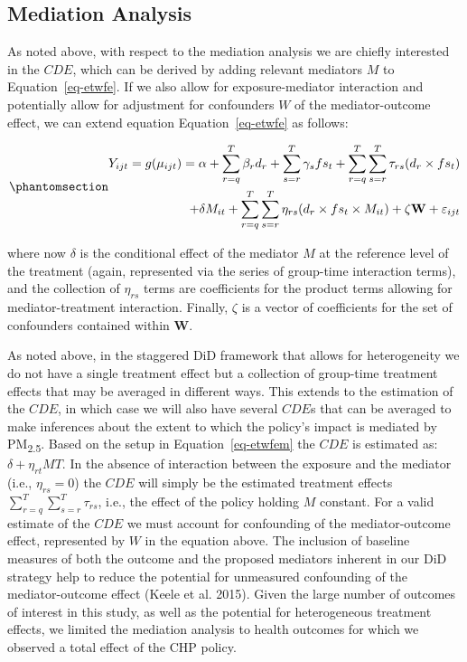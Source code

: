 \documentclass[
  letterpaper,
  DIV=11,
  numbers=noendperiod]{scrartcl}
\begin{document}
\subsection{Mediation Analysis}\label{mediation-analysis}

As noted above, with respect to the mediation analysis we are chiefly
interested in the \(CDE\), which can be derived by adding relevant
mediators \(M\) to Equation~\ref{eq-etwfe}. If we also allow for
exposure-mediator interaction and potentially allow for adjustment for
confounders \(W\) of the mediator-outcome effect, we can extend equation
Equation~\ref{eq-etwfe} as follows:

\begin{equation}\phantomsection\label{eq-etwfem}{
\begin{aligned}
Y_{ijt}=g(\mu_{ijt}) = \alpha + \sum_{r=q}^{T} \beta_{r} d_{r} + \sum_{s=r}^{T} \gamma_{s} fs_{t}+ \sum_{r=q}^{T} \sum_{s=r}^{T} \tau_{rs} (d_{r} \times fs_{t}) \\ + \delta M_{it} + \sum_{r=q}^{T} \sum_{s=r}^{T} \eta_{rs} (d_{r} \times fs_{t} \times M_{it}) + \zeta \mathbf{W} + \varepsilon_{ijt}
\end{aligned}
}\end{equation}

where now \(\delta\) is the conditional effect of the mediator \(M\) at
the reference level of the treatment (again, represented via the series
of group-time interaction terms), and the collection of \(\eta_{rs}\)
terms are coefficients for the product terms allowing for
mediator-treatment interaction. Finally, \(\zeta\) is a vector of
coefficients for the set of confounders contained within \(\mathbf{W}\).

As noted above, in the staggered DiD framework that allows for
heterogeneity we do not have a single treatment effect but a collection
of group-time treatment effects that may be averaged in different ways.
This extends to the estimation of the \(CDE\), in which case we will
also have several \(CDE\)s that can be averaged to make inferences about
the extent to which the policy's impact is mediated by
PM\textsubscript{2.5}. Based on the setup in Equation~\ref{eq-etwfem}
the \(CDE\) is estimated as: \(\delta + \eta_{rt}MT\). In the absence of
interaction between the exposure and the mediator (i.e.,
\(\eta_{rs}=0\)) the \(CDE\) will simply be the estimated treatment
effects \(\sum_{r=q}^{T} \sum_{s=r}^{T} \tau_{rs}\), i.e., the effect of
the policy holding \(M\) constant. For a valid estimate of the \(CDE\)
we must account for confounding of the mediator-outcome effect,
represented by \(W\) in the equation above. The inclusion of baseline
measures of both the outcome and the proposed mediators inherent in our
DiD strategy help to reduce the potential for unmeasured confounding of
the mediator-outcome effect (Keele et al. 2015). Given the large number
of outcomes of interest in this study, as well as the potential for
heterogeneous treatment effects, we limited the mediation analysis to
health outcomes for which we observed a total effect of the CHP policy.
\end{document}
